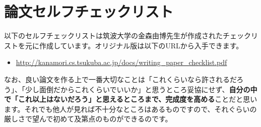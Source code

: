 \chapter{論文セルフチェックリスト}
\label{chap:self-check}

以下のセルフチェックリストは筑波大学の金森由博先生が作成されたチェックリストを元に作成しています。オリジナル版は以下のURLから入手できます。
\begin{itemize}
  \item \url{http://kanamori.cs.tsukuba.ac.jp/docs/writing_paper_checklist.pdf}
\end{itemize}

なお、良い論文を作る上で一番大切なことは「これくらいなら許されるだろう」、「少し面倒だからこれくらいでいいか」と思うところ妥協にせず、\textbf{自分の中で「これ以上はないだろう」と思えるところまで、完成度を高める}ことだと思います。それでも他人が見れば不十分なところはあるものですので、それぐらいの厳しさで望んで初めて及第点のものができるのです。


